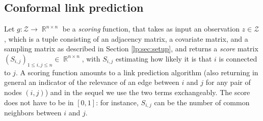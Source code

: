 \documentclass[a4paper, 11pt]{article}
\theoremstyle{remark}
\DeclareMathOperator{\R}{\mathbb{R}}
\newcommand{\EM}{\ensuremath}
\newcommand{\cZ}{\EM{\mathcal{Z}}}
\begin{document}
\subsection{Conformal link prediction}


Let $g: \cZ \rightarrow \R^{n \times n}$ be a \textit{scoring} function, that takes as input an observation $z \in  \cZ$, 
which is a tuple consisting of an adjacency matrix, a covariate matrix, and a sampling matrix as described in Section \ref{lp:sec:setup}, 
and returns a \textit{score} matrix $(S_{i,j})_{1 \leq i,j \leq n} \in \R^{n \times n}$, with $S_{i,j}$ estimating how likely it is that $i$ is connected to $j$.
A scoring function amounts to a link prediction algorithm (also returning in general an indicator of the relevance of an edge between $i$ and $j$ for any pair of nodes $(i,j)$) and in the sequel we use the two terms exchangeably. 
The score does not have to be in $[0,1]$: for instance, $S_{i,j}$ can be the number of common neighbors between $i$ and $j$.
\end{document}
